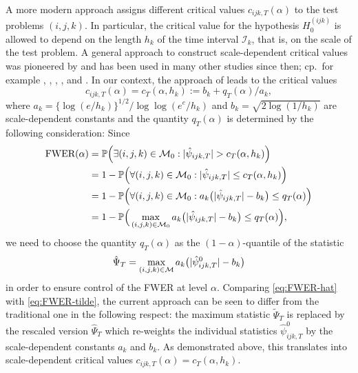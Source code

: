 \documentclass[a4paper,12pt]{article}
\numberwithin{equation}{section}
\begin{document}
A more modern approach assigns different critical values $c_{ijk,T}(\alpha)$ to the test problems $(i,j,k)$. In particular, the critical value for the hypothesis $H_0^{(ijk)}$ is allowed to depend on the length $h_k$ of the time interval $\mathcal{I}_k$, that is, on the scale of the test problem. A general approach to construct scale-dependent critical values was pioneered by \cite{DuembgenSpokoiny2001} and has been used in many other studies since then; cp.\ for example \cite{Rohde2008}, \cite{DuembgenWalther2008}, \cite{RufibachWalther2010}, \cite{SchmidtHieber2013}, \cite{EckleBissantzDette2017} and \cite{Dunker2019}. In our context, the approach of \cite{DuembgenSpokoiny2001} leads to the critical values 
\begin{equation*}
c_{ijk,T}(\alpha) = c_T(\alpha,h_k) := b_k + q_T(\alpha)/a_k, 
\end{equation*}
where $a_k = \{\log(e/h_k)\}^{1/2} / \log \log(e^e / h_k)$ and $b_k = \sqrt{2 \log(1/h_k)}$ are scale-dependent constants and the quantity $q_T(\alpha)$ is determined by the following consideration: Since 
\begin{align}
\text{FWER}(\alpha)
  & = \mathbb{P} \Big( \exists (i,j,k) \in \mathcal{M}_0: |\hat{\psi}_{ijk,T}| > c_T(\alpha,h_k) \Big) \nonumber \\
 & =  1 - \mathbb{P} \Big( \forall (i,j,k) \in \mathcal{M}_0: |\hat{\psi}_{ijk,T}| \le c_T(\alpha,h_k) \Big) \nonumber \\
 & =  1 - \mathbb{P} \Big( \forall (i,j,k) \in \mathcal{M}_0: a_k \big(|\hat{\psi}_{ijk,T}| - b_k\big) \le q_T(\alpha) \Big) \nonumber \\
 & = 1 - \mathbb{P}\Big( \max_{(i,j,k) \in \mathcal{M}_0} a_k \big( |\hat{\psi}_{ijk,T}| - b_k \big) \le q_T(\alpha) \Big), \label{eq:FWER-hat}
\end{align}
we need to choose the quantity $q_T(\alpha)$ as the $(1-\alpha)$-quantile of the statistic 
\[ \hat{\Psi}_T = \max_{(i,j,k) \in \mathcal{M}} a_k \big( |\hat{\psi}_{ijk,T}^0| - b_k \big) \]
in order to ensure control of the FWER at level $\alpha$. Comparing \eqref{eq:FWER-hat} with \eqref{eq:FWER-tilde}, the current approach can be seen to differ from the traditional one in the following respect: the maximum statistic $\tilde{\Psi}_T$ is replaced by the rescaled version $\hat{\Psi}_T$ which re-weights the individual statistics $\hat{\psi}_{ijk,T}^0$ by the scale-dependent constants $a_k$ and $b_k$. As demonstrated above, this translates into scale-dependent critical values $c_{ijk,T}(\alpha) = c_T(\alpha,h_k)$. 
\end{document}
